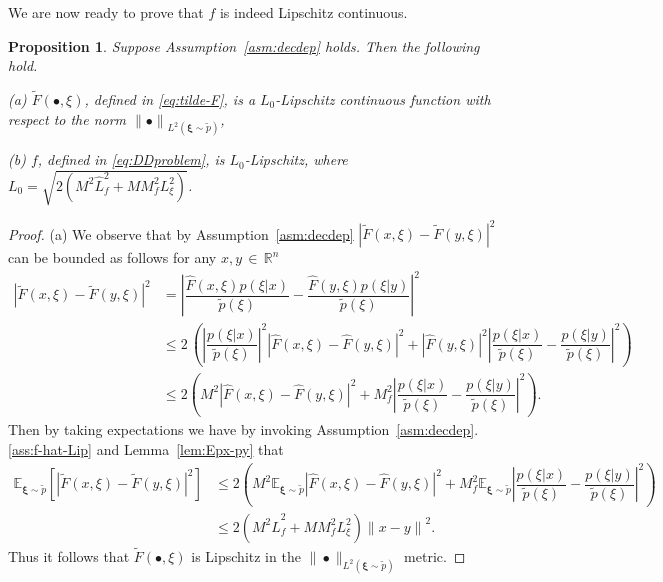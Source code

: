 \documentclass[11pt,reqno]{amsart}
\newcommand{\1}{{\bf 1}}
\newcommand{\2}{{\bf 2}}
\newcommand{\us}[1]{\textcolor{red}{#1}}
\newcommand{\bxi}{\boldsymbol{\xi}}
\newcommand{\R}{\mathbb R}
\newcommand{\lp}{\left(}
\newcommand{\rp}{\right)}
\newcommand{\lln}{\left|}
\newcommand{\rrn}{\right|}
\numberwithin{equation}{section}
\newtheorem{proposition}{Proposition}[section]
\theoremstyle{remark}
\begin{document}
{{				We are now ready to prove that $f$ is indeed Lipschitz continuous.
				
				\begin{proposition}\label{lem:F-decdep1-Lip}
					Suppose Assumption~\ref{asm:decdep} holds. Then the following hold. 
					
					\noindent (a) $\tilde{F}(\bullet, \xi)$, defined in \eqref{eq:tilde-F}, is a $L_0$-Lipschitz continuous function with respect to the norm ${\| \bullet \|}_{L^2(\bxi \sim \tilde{p})}$, 
					
					\noindent (b) $f$, defined in \eqref{eq:DDproblem},  is $L_0$-Lipschitz, 
					where $L_0 = \sqrt{2 \lp M^2 \hat{L}_f^2 +M M_f^2L_\xi^2 \rp}$.  
				\end{proposition}
				\begin{proof}
				\noindent (a) We observe that by Assumption~\ref{asm:decdep} ${\lln \tilde{F}(x,\xi) - \tilde{F}(y,\xi)\rrn}^2$ can be bounded  as follows for any $x, y \, \in \, \R^n$ 
				\begin{align*}
					{\lln \tilde{F}(x,\xi) - \tilde{F}(y,\xi)\rrn}^2  &=  {\lln \dfrac{\hat{F}(x, \xi)p(\xi | x)}{\tilde{p}(\xi)} - \dfrac{\hat{F}(y, \xi)p(\xi | y)}{\tilde{p}(\xi)} \rrn}^2\\
					&\leq 2 \,  \lp {\lln \dfrac{p(\xi|x)}{\tilde{p}(\xi)} \rrn}^2 {\lln \hat{F}(x, \xi) - \hat{F}(y, \xi) \rrn}^2 + {\lln \hat{F}(y, \xi) \rrn}^2 {\lln \dfrac{p(\xi|x)}{\tilde{p}(\xi)} - \dfrac{p(\xi | y)}{\tilde{p}(\xi)} \rrn}^2 \rp\\
					&\leq 2 \lp M^2  {\lln \hat{F}(x, \xi) - \hat{F}(y, \xi) \rrn}^2 + M_f^2  {\lln \dfrac{p(\xi|x)}{\tilde{p}(\xi)} - \dfrac{p(\xi | y)}{\tilde{p}(\xi)} \rrn}^2 \rp.
				\end{align*}
				Then by taking expectations we have by invoking Assumption~\ref{asm:decdep}.\ref{ass:f-hat-Lip} and Lemma~\ref{lem:Epx-py} that 
				\begin{align*}
					\mathbb{E}_{\bxi \sim \tilde{p}}\left[ {\lln \tilde{F}(x,\xi) - \tilde{F}(y,\xi)\rrn}^2 \right]
					&\leq 2 \lp M^2\mathbb{E}_{{\bxi \sim \tilde{p}}}{\lln \hat{F}(x, \xi) - \hat{F}(y, \xi) \rrn}^2 + M_f^2\mathbb{E}_{{\bxi \sim \tilde{p}}}{\lln \dfrac{p(\xi|x)}{\tilde{p}(\xi)} - \dfrac{p(\xi | y)}{\tilde{p}(\xi)} \rrn}^2 \rp\\
					& \leq 2 \lp M^2\hat{L}_f^2 + M M_f^2 L_\xi^2 \rp {\|x-y\|}^2.
				\end{align*}
					Thus it follows that $\tilde{F}(\bullet,\xi)$ is Lipschitz in the $\|\bullet\|_{L^2(\bxi\sim \tilde{p})}$ metric. 
					

\end{proof}}}
\end{document}
